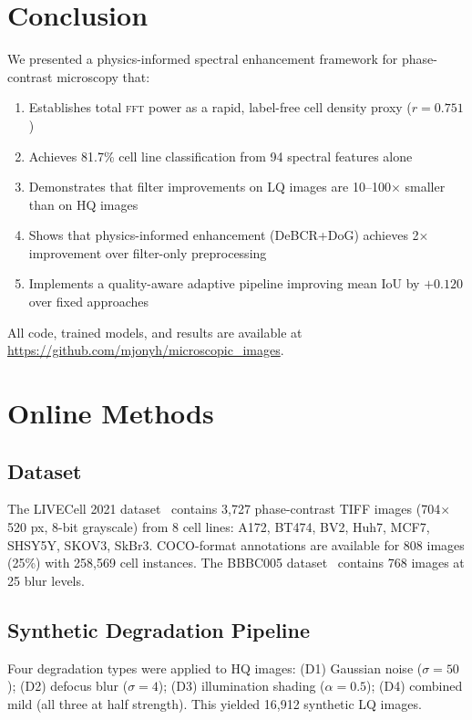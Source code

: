 \documentclass[11pt,a4paper]{article}
\newcommand{\fft}{\textsc{fft}\xspace}
\begin{document}
\section{Conclusion}
\label{sec:conclusion}

We presented a physics-informed spectral enhancement framework for phase-contrast microscopy that:

\begin{enumerate}[nosep]
    \item Establishes total \fft power as a rapid, label-free cell density proxy ($r{=}0.751$)
    \item Achieves 81.7\% cell line classification from 94 spectral features alone
    \item Demonstrates that filter improvements on LQ images are 10--100$\times$ smaller than on HQ images
    \item Shows that physics-informed enhancement (DeBCR+DoG) achieves 2$\times$ improvement over filter-only preprocessing
    \item Implements a quality-aware adaptive pipeline improving mean IoU by $+0.120$ over fixed approaches
\end{enumerate}

All code, trained models, and results are available at \url{https://github.com/mjonyh/microscopic_images}.

\newpage
\section*{Online Methods}

\subsection{Dataset}
The LIVECell 2021 dataset~\cite{edlund2021livecell} contains 3,727 phase-contrast TIFF images (704$\times$520 px, 8-bit grayscale) from 8 cell lines: A172, BT474, BV2, Huh7, MCF7, SHSY5Y, SKOV3, SkBr3. COCO-format annotations are available for 808 images (25\%) with 258,569 cell instances. The BBBC005 dataset~\cite{ljosa2012annotated} contains 768 images at 25 blur levels.

\subsection{Synthetic Degradation Pipeline}
Four degradation types were applied to HQ images: (D1) Gaussian noise ($\sigma{=}50$); (D2) defocus blur ($\sigma{=}4$); (D3) illumination shading ($\alpha{=}0.5$); (D4) combined mild (all three at half strength). This yielded 16,912 synthetic LQ images.
\end{document}
